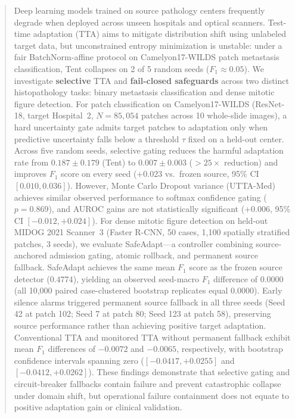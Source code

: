 \documentclass[conference]{IEEEtran}
\begin{document}
\begin{abstract}
Deep learning models trained on source pathology centers frequently degrade when deployed across unseen hospitals and optical scanners.
Test-time adaptation (TTA) aims to mitigate distribution shift using unlabeled target data, but unconstrained entropy minimization is unstable: under a fair BatchNorm-affine protocol on Camelyon17-WILDS patch metastasis classification, Tent collapses on 2 of 5 random seeds ($F_1 \approx 0.05$).
We investigate \textbf{selective} TTA and \textbf{fail-closed safeguards} across two distinct histopathology tasks: binary metastasis classification and dense mitotic figure detection.
For patch classification on Camelyon17-WILDS (ResNet-18, target Hospital~2, $N=85{,}054$ patches across 10 whole-slide images), a hard uncertainty gate admits target patches to adaptation only when predictive uncertainty falls below a threshold $\tau$ fixed on a held-out center.
Across five random seeds, selective gating reduces the harmful adaptation rate from $0.187 \pm 0.179$ (Tent) to $0.007 \pm 0.003$ ($>25\times$ reduction) and improves $F_1$ score on every seed ($+0.023$ vs.\ frozen source, 95\% CI $[0.010, 0.036]$).
However, Monte Carlo Dropout variance (UTTA-Med) achieves similar observed performance to softmax confidence gating ($p=0.869$), and AUROC gains are not statistically significant ($+0.006$, 95\% CI $[-0.012, +0.024]$).
For dense mitotic figure detection on held-out MIDOG 2021 Scanner~3 (Faster R-CNN, 50 cases, 1,100 spatially stratified patches, 3 seeds), we evaluate SafeAdapt---a controller combining source-anchored admission gating, atomic rollback, and permanent source fallback.
SafeAdapt achieves the same mean $F_1$ score as the frozen source detector ($0.4774$), yielding an observed seed-macro $F_1$ difference of $0.0000$ (all 10,000 paired case-clustered bootstrap replicates equal $0.0000$).
Early silence alarms triggered permanent source fallback in all three seeds (Seed 42 at patch 102; Seed 7 at patch 80; Seed 123 at patch 58), preserving source performance rather than achieving positive target adaptation.
Conventional TTA and monitored TTA without permanent fallback exhibit mean $F_1$ differences of $-0.0072$ and $-0.0065$, respectively, with bootstrap confidence intervals spanning zero ($[-0.0417, +0.0255]$ and $[-0.0412, +0.0262]$).
These findings demonstrate that selective gating and circuit-breaker fallbacks contain failure and prevent catastrophic collapse under domain shift, but operational failure containment does not equate to positive adaptation gain or clinical validation.
\end{abstract}
\end{document}
